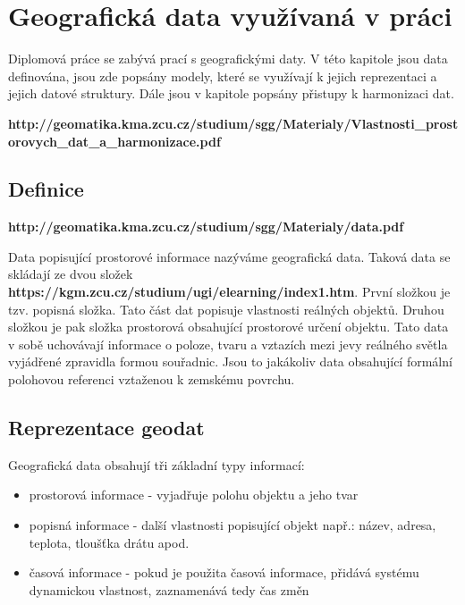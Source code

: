\chapter{Geografická data využívaná v práci}
\label{chapter:geograficka_data_vyuzivana_v_praci}

Diplomová práce se zabývá prací s geografickými daty. V této kapitole jsou data definována, jsou zde popsány modely, které se využívají k jejich reprezentaci a jejich datové struktury. Dále jsou v kapitole popsány přistupy k harmonizaci dat. 

\textbf{http://geomatika.kma.zcu.cz/studium/sgg/Materialy/Vlastnosti\_prostorovych\_dat\_a\_harmonizace.pdf}

\section{Definice}
\label{section:geograficka_data_definice}

\textbf{http://geomatika.kma.zcu.cz/studium/sgg/Materialy/data.pdf}

Data popisující prostorové informace nazýváme geografická data. Taková data se skládají ze dvou složek \textbf{https://kgm.zcu.cz/studium/ugi/elearning/index1.htm}. První složkou je tzv. popisná složka. Tato část dat popisuje vlastnosti reálných objektů. Druhou složkou je pak složka prostorová obsahující prostorové určení objektu. Tato data v sobě uchovávají informace o poloze, tvaru a vztazích mezi jevy reálného světla vyjádřené zpravidla formou souřadnic. Jsou to jakákoliv data obsahující formální polohovou referenci vztaženou k zemskému povrchu. 

\section{Reprezentace geodat}
\label{section:reprezentace_geodat}

Geografická data obsahují tři základní typy informací: 

\begin{itemize}
  \item prostorová informace - vyjadřuje polohu objektu a jeho tvar
  \item popisná informace - další vlastnosti popisující objekt např.: název, adresa, teplota, tloušťka drátu apod.
  \item časová informace - pokud je použita časová informace, přidává systému dynamickou vlastnost, zaznamenává tedy čas změn
  \end{itemize}

